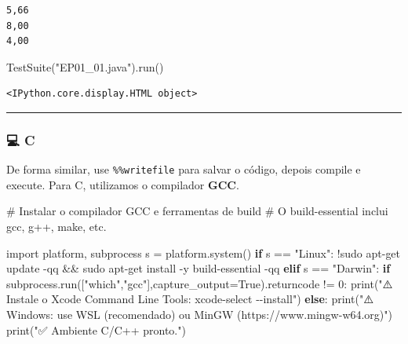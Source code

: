 \documentclass[
  portuguese,
  letterpaper,
  openany,
  oneside,
  12pt,
  a4paper]{book}
\newenvironment{Shaded}{\begin{snugshade}}{\end{snugshade}}
\newcommand{\BuiltInTok}[1]{\textcolor[rgb]{0.00,0.23,0.31}{#1}}
\newcommand{\CommentTok}[1]{\textcolor[rgb]{0.37,0.37,0.37}{#1}}
\newcommand{\ControlFlowTok}[1]{\textcolor[rgb]{0.00,0.23,0.31}{\textbf{#1}}}
\newcommand{\DecValTok}[1]{\textcolor[rgb]{0.68,0.00,0.00}{#1}}
\newcommand{\ImportTok}[1]{\textcolor[rgb]{0.00,0.46,0.62}{#1}}
\newcommand{\NormalTok}[1]{\textcolor[rgb]{0.00,0.23,0.31}{#1}}
\newcommand{\OperatorTok}[1]{\textcolor[rgb]{0.37,0.37,0.37}{#1}}
\newcommand{\StringTok}[1]{\textcolor[rgb]{0.13,0.47,0.30}{#1}}
\newcommand{\VariableTok}[1]{\textcolor[rgb]{0.07,0.07,0.07}{#1}}
\begin{document}
\begin{verbatim}
5,66
8,00
4,00
\end{verbatim}

\begin{Shaded}
\begin{Highlighting}[]
\NormalTok{TestSuite(}\StringTok{"EP01\_01.java"}\NormalTok{).run()}
\end{Highlighting}
\end{Shaded}

\begin{verbatim}
<IPython.core.display.HTML object>
\end{verbatim}

\begin{center}\rule{0.5\linewidth}{0.5pt}\end{center}

\subsubsection{💻 C}\label{c}

De forma similar, use \texttt{\%\%writefile} para salvar o código,
depois compile e execute. Para C, utilizamos o compilador \textbf{GCC}.

\begin{Shaded}
\begin{Highlighting}[]
\CommentTok{\# Instalar o compilador GCC e ferramentas de build}
\CommentTok{\# O build{-}essential inclui gcc, g++, make, etc.}

\ImportTok{import}\NormalTok{ platform, subprocess}
\NormalTok{s }\OperatorTok{=}\NormalTok{ platform.system()}
\ControlFlowTok{if}\NormalTok{ s }\OperatorTok{==} \StringTok{"Linux"}\NormalTok{:}
    \OperatorTok{!}\NormalTok{sudo apt}\OperatorTok{{-}}\NormalTok{get update }\OperatorTok{{-}}\NormalTok{qq }\OperatorTok{\&\&}\NormalTok{ sudo apt}\OperatorTok{{-}}\NormalTok{get install }\OperatorTok{{-}}\NormalTok{y build}\OperatorTok{{-}}\NormalTok{essential }\OperatorTok{{-}}\NormalTok{qq}
\ControlFlowTok{elif}\NormalTok{ s }\OperatorTok{==} \StringTok{"Darwin"}\NormalTok{:}
    \ControlFlowTok{if}\NormalTok{ subprocess.run([}\StringTok{"which"}\NormalTok{,}\StringTok{"gcc"}\NormalTok{],capture\_output}\OperatorTok{=}\VariableTok{True}\NormalTok{).returncode }\OperatorTok{!=} \DecValTok{0}\NormalTok{:}
        \BuiltInTok{print}\NormalTok{(}\StringTok{"⚠️ Instale o Xcode Command Line Tools: xcode{-}select {-}{-}install"}\NormalTok{)}
\ControlFlowTok{else}\NormalTok{:}
    \BuiltInTok{print}\NormalTok{(}\StringTok{"⚠️ Windows: use WSL (recomendado) ou MinGW (https://www.mingw{-}w64.org)"}\NormalTok{)}
\BuiltInTok{print}\NormalTok{(}\StringTok{"✅ Ambiente C/C++ pronto."}\NormalTok{)}
\end{Highlighting}
\end{Shaded}
\end{document}
